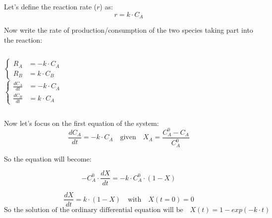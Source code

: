 \documentclass[xcolor={dvipsnames,rgb}, aspectratio=169]{beamer}
\begin{document}
\begin{frame}{}
   Let's define the reaction rate ($r$) as:
   \begin{equation*}
      r = k \cdot C_{A}
   \end{equation*}

   Now write the rate of production/consumption of the two species taking part into the reaction:
   \begin{columns}[T]%
      \column{5cm}
      \begin{equation*}
         \left\{
            \begin{aligned}
               R_{A} &= -k \cdot C_{A} \\
               R_{B} &= k \cdot C_{B}
            \end{aligned}
         \right .
      \end{equation*}
      \column{5cm}
      \begin{equation*}
         \left\{
            \begin{aligned}
               \frac{dC_{A}}{dt} &= -k \cdot C_{A} \\
               \frac{dC_{B}}{dt} &= k \cdot C_{A}
            \end{aligned}
            \right .
      \end{equation*}
   \end{columns}
\end{frame}

\begin{frame}{}
   Now let's focus on the first equation of the system:
   \begin{equation*}
      \frac{dC_{A}}{dt} = -k \cdot C_{A} \quad\text{given}\quad X_{A} = \frac{C_{A}^{0}-C_{A}}{C_{A}^{0}}
   \end{equation*}

   So the equation will become:

   \begin{equation*}
      -C_{A}^{0} \cdot \frac{dX}{dt} = -k\cdot C_{A}^{0}\cdot(1-X)
   \end{equation*}

   \begin{equation*}
      \frac{dX}{dt} = k \cdot (1 - X) \quad\text{with}\quad X(t = 0) = 0
   \end{equation*}
   \begin{equation*}
      \text{So the solution of the ordinary differential equation will be}\quad X(t) = 1 - exp(-k \cdot t)
   \end{equation*}
\end{frame}
\end{document}
